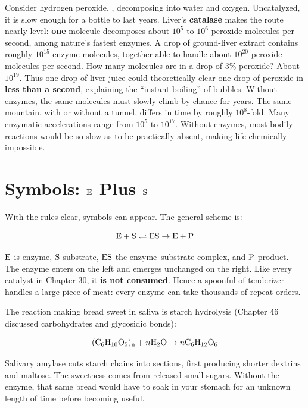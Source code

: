 \begin{qiaoliang}
Consider hydrogen peroxide, , decomposing into water and oxygen. Uncatalyzed, it is slow enough for a bottle to last years. Liver's \textbf{catalase} makes the route nearly level: \textbf{one} molecule decomposes about $10^{5}$ to $10^{6}$ peroxide molecules per second, among nature's fastest enzymes. A drop of ground-liver extract contains roughly $10^{15}$ enzyme molecules, together able to handle about $10^{20}$ peroxide molecules per second. How many molecules are in a drop of $3\%$ peroxide? About $10^{19}$. Thus one drop of liver juice could theoretically clear one drop of peroxide in \textbf{less than a second}, explaining the ``instant boiling'' of bubbles. Without enzymes, the same molecules must slowly climb by chance for years. The same mountain, with or without a tunnel, differs in time by roughly $10^{8}$-fold. Many enzymatic accelerations range from $10^{5}$ to $10^{17}$. Without enzymes, most bodily reactions would be so slow as to be practically absent, making life chemically impossible.
\end{qiaoliang}

\section{Symbols: \texorpdfstring{$\mathrm{E}$ Plus $\mathrm{S}$}{E Plus S}}

With the rules clear, symbols can appear. The general scheme is:

\[\mathrm{E} + \mathrm{S} \rightleftharpoons \mathrm{ES} \rightarrow \mathrm{E} + \mathrm{P}\]

$\mathrm{E}$ is enzyme, $\mathrm{S}$ substrate, $\mathrm{ES}$ the enzyme--substrate complex, and $\mathrm{P}$ product. The enzyme enters on the left and emerges unchanged on the right. Like every catalyst in Chapter 30, it \textbf{is not consumed}. Hence a spoonful of tenderizer handles a large piece of meat: every enzyme can take thousands of repeat orders.

The reaction making bread sweet in saliva is starch hydrolysis (Chapter 46 discussed carbohydrates and glycosidic bonds):

\[\mathrm{(C_6H_{10}O_5)_{n}} + n\mathrm{H_2O} \rightarrow n\mathrm{C_6H_{12}O_6}\]

Salivary amylase cuts starch chains into sections, first producing shorter dextrins and maltose. The sweetness comes from released small sugars. Without the enzyme, that same bread would have to soak in your stomach for an unknown length of time before becoming useful.

